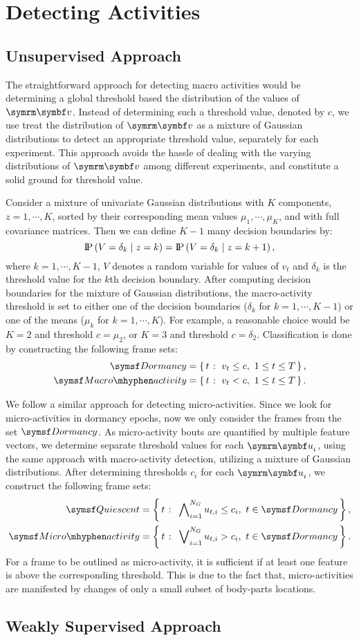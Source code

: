\section{Detecting Activities}
\subsection{Unsupervised Approach}
The straightforward approach for detecting macro activities would be determining a global threshold based the distribution of the values of $\V{v}$.
Instead of determining such a threshold value, denoted by $c$, we use treat the distribution of $\V{v}$ as a mixture of Gaussian distributions to detect an appropriate threshold value, separately for each experiment.
This approach avoids the hassle of dealing with the varying distributions of $\V{v}$ among different experiments, and constitute a solid ground for threshold value.

Consider a mixture of univariate Gaussian distributions with $K$ components, $z=1, \cdots, K$, sorted by their corresponding mean values $\mu_1, \cdots, \mu_K$, and with full covariance matrices. Then we can define $K-1$ many decision boundaries by:
\begin{equation}
	\operatorname{\text{I\kern-0.15em P}} \left( V=\delta_k \;\middle|\; z=k \right) = \operatorname{\text{I\kern-0.15em P}} \left( V=\delta_k \;\middle|\; z=k+1 \right),
\end{equation}
where $k=1, \cdots, K-1$, $V$ denotes a random variable for values of $v_t$ and $\delta_k$ is the threshold value for the $k$th decision boundary.
After computing decision boundaries for the mixture of Gaussian distributions, the macro-activity threshold is set to either one of the decision boundaries ($\delta_k$ for $k=1, \cdots, K-1$) or one of the means ($\mu_k$ for $k=1, \cdots, K$).
For example, a reasonable choice would be $K=2$ and threshold $c=\mu_2$, or $K=3$ and threshold $c=\delta_2$.
Classification is done by constructing the following frame sets:
\begin{align}
	\Dormancy      & =\Set{t}{v_t \leq c, \ 1\leq t \leq T}, \\
	\MacroActivity & =\Set{t}{v_t<c, \ 1\leq t \leq T}.
\end{align}

We follow a similar approach for detecting micro-activities.
Since we look for micro-activities in dormancy epochs, now we only consider the frames from the set $\Dormancy$.
As micro-activity bouts are quantified by multiple feature vectors, we determine separate threshold values for each $\V{u}_i$, using the same approach with macro-activity detection, utilizing a mixture of Gaussian distributions.
After determining thresholds $c_i$ for each $\V{u}_i$, we construct the following frame sets:
\begin{align}
	\Quiescent     & = \Set{t}{\bigwedge\nolimits_{i=1}^{N_G} u_{t,i} \leq c_i, \ t \in \Dormancy}, \\
	\MicroActivity & = \Set{t}{\bigvee\nolimits_{i=1}^{N_G} u_{t,i} > c_i, \ t \in \Dormancy}.
\end{align}
For a frame to be outlined as micro-activity, it is sufficient if at least one feature is above the corresponding threshold.
This is due to the fact that, micro-activities are manifested by changes of only a small subset of body-parts locations.

\subsection{Weakly Supervised Approach}
